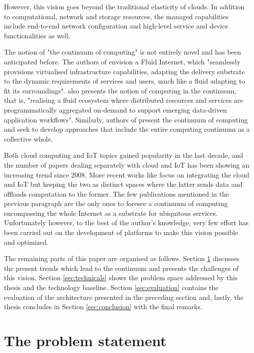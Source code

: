 \documentclass{ieeeaccess}
\begin{document}
However, this vision goes beyond the traditional elasticity of clouds. In addition to computational, network and storage resources, the managed capabilities include end-to-end network configuration and high-level service and device functionalities as well.

The notion of "the continuum of computing" is not entirely novel and has been anticipated before. The authors of \cite{fluid-internet} envision a Fluid Internet, which "seamlessly provisions virtualised infrastructure capabilities, adapting the delivery substrate to the dynamic requirements of services and users, much like a fluid adapting to fit its surroundings". \cite{computing-in-continuum} also presents the notion of computing in the continuum, that is, "realising a fluid ecosystem where distributed resources and services are programmatically aggregated on-demand to support emerging data-driven application workflows". Similarly, authors of \cite{harnessing-continuum} present the continuum of computing and seek to develop approaches that include the entire computing continuum as a collective whole.

Both cloud computing and IoT topics gained popularity in the last decade, and the number of papers dealing separately with cloud and IoT has been showing an increasing trend since 2008. More recent works like \cite{cloud-iot} focus on integrating the cloud and IoT but keeping the two as distinct spaces where the latter sends data and offloads computation to the former. The few publications mentioned in the previous paragraph are the only ones to foresee a continuum of computing encompassing the whole Internet as a substrate for ubiquitous services. Unfortunately however, to the best of the author's knowledge, very few effort has been carried out on the development of platforms to make this vision possible and optimized.

The remaining parts of this paper are organised as follows. Section \ref{sec:challenges} discusses the present trends which lead to the continuum and presents the challenges of this vision. Section \ref{sec:technicals} shows the problem space addressed by this thesis and the technology baseline. Section \ref{sec:evaluation} contains the evaluation of the architecture presented in the preceding section and, lastly, the thesis concludes in Section \ref{sec:conclusion} with the final remarks.

\section{The problem statement}
\label{sec:challenges}
\end{document}
